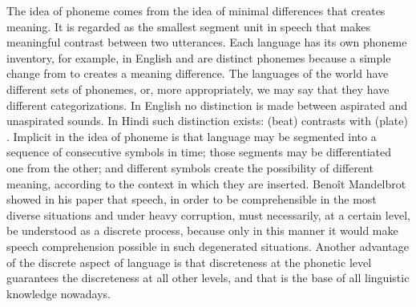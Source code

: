 The idea of phoneme comes from the idea of minimal differences that creates meaning. 
It is regarded as the smallest segment unit in speech that makes meaningful contrast between two utterances. 
Each language has its own phoneme inventory, for example, in English  and  are distinct phonemes because a simple change from  to  creates a meaning difference. 
The languages of the world have different sets of phonemes, or, more appropriately, we may say that they have different categorizations. In English no distinction is made between aspirated and unaspirated sounds. 
In Hindi such distinction exists:  
(beat) contrasts with  (plate) \citep{ladefoged1996}. 
Implicit in the idea of phoneme is that language may be segmented into a sequence of consecutive symbols in time; those segments may be differentiated one from the other; and different symbols create the possibility of different meaning, according to the context in which they are inserted. 
Beno\^it Mandelbrot showed in his paper \citep{mandelbrot} that speech, in order to be comprehensible in the most diverse situations and under heavy corruption, must necessarily, at a certain level, be understood as a discrete process, because only in this manner it would make speech comprehension possible in such degenerated situations. Another advantage of the discrete aspect of language is that discreteness at the phonetic level guarantees the discreteness at all other levels, and that is the base of all linguistic knowledge nowadays. 

